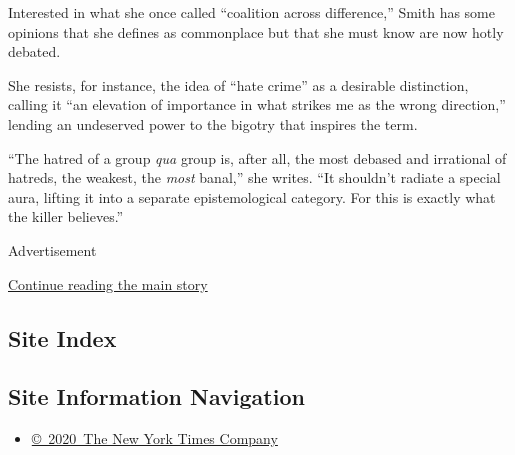 Interested in what she once called ``coalition across difference,''
Smith has some opinions that she defines as commonplace but that she
must know are now hotly debated.

She resists, for instance, the idea of ``hate crime'' as a desirable
distinction, calling it ``an elevation of importance in what strikes me
as the wrong direction,'' lending an undeserved power to the bigotry
that inspires the term.

``The hatred of a group \emph{qua} group is, after all, the most debased
and irrational of hatreds, the weakest, the \emph{most} banal,'' she
writes. ``It shouldn't radiate a special aura, lifting it into a
separate epistemological category. For this is exactly what the killer
believes.''

Advertisement

\protect\hyperlink{after-bottom}{Continue reading the main story}

\hypertarget{site-index}{%
\subsection{Site Index}\label{site-index}}

\hypertarget{site-information-navigation}{%
\subsection{Site Information
Navigation}\label{site-information-navigation}}

\begin{itemize}
\tightlist
\item
  \href{https://help.nytimes3xbfgragh.onion/hc/en-us/articles/115014792127-Copyright-notice}{©~2020~The
  New York Times Company}
\end{itemize}

